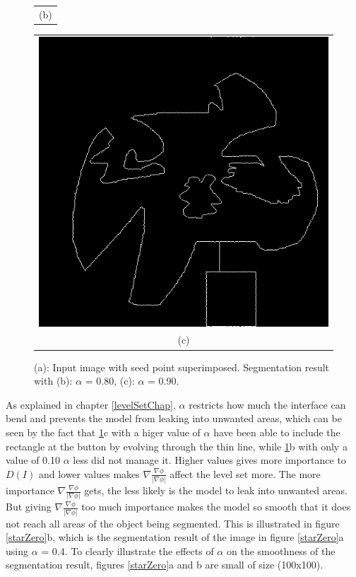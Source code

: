 \begin{figure}[h!]
\begin{minipage}{.46\textwidth}
\begin{tabular}{c}
(b)
\end{tabular}
\end{minipage}
\begin{minipage}{.46\textwidth}
\begin{tabular}{c}
\includegraphics[width=.9\textwidth]{results/2D/randOrgWSeeda090} \\
(c)
\end{tabular}
\end{minipage}
\caption{(a): Input image with seed point superimposed. Segmentation result with (b): $\alpha$ = 0.80, (c): $\alpha$ = 0.90.}
\label{randOrgWSeed}
\end{figure}
As explained in chapter \ref{levelSetChap}, $\alpha$ restricts how much the interface can bend and prevents the model from leaking into unwanted areas, which can be seen by the fact that \ref{randOrgWSeed}c with a higer value of $\alpha$ have been able to include the rectangle at the button by evolving through the thin line, while \ref{randOrgWSeed}b with only a value of 0.10 $\alpha$ less did not manage it. Higher values gives more importance to \(D(I)\) and lower values makes \(\nabla \frac{\nabla \phi}{|\nabla \phi|}\) affect the level set more. The more importance \(\nabla \frac{\nabla \phi}{|\nabla \phi|}\) gets, the less likely is the model to leak into unwanted areas. But giving \(\nabla \frac{\nabla \phi}{|\nabla \phi|}\) too much importance makes the model so smooth that it does not reach all areas of the object being segmented. This is illustrated in figure \ref{starZero}b, which is the segmentation result of the image in figure \ref{starZero}a using $\alpha$ = 0.4. To clearly illustrate the effects of $\alpha$ on the smoothness of the segmentation result, figures \ref{starZero}a and b are small of size (100x100).
